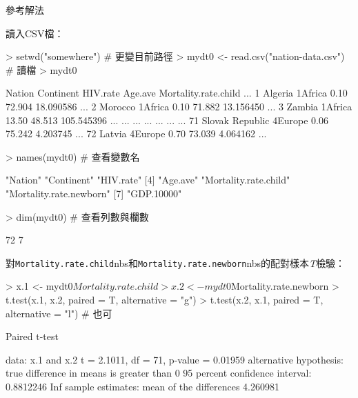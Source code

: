 \documentclass[14pt, aspectratio=43]{beamer}
\newcommand{\nbs}{\hskip3pt plus 1pt minus 1pt}
\begin{document}
\begin{frame}{參考解法}

讀入CSV檔：
\begin{RC}
> setwd("somewhere") # 更變目前路徑
> mydt0 <- read.csv("nation-data.csv")  # 讀檔
> mydt0
\end{RC}
\begin{R}
            Nation Continent HIV.rate Age.ave Mortality.rate.child ...
1          Algeria   1Africa     0.10  72.904            18.090586 ...
2          Morocco   1Africa     0.10  71.882            13.156450 ...
3           Zambia   1Africa    13.50  48.513           105.545396 ...
               ...       ...      ...     ...                  ... ...
71 Slovak Republic   4Europe     0.06  75.242             4.203745 ...
72          Latvia   4Europe     0.70  73.039             4.064162 ...
\end{R}

\framebreak 

\begin{RC}
> names(mydt0)  # 查看變數名
\end{RC}
\begin{R}
[1] "Nation"     "Continent"              "HIV.rate"              
[4] "Age.ave"    "Mortality.rate.child"   "Mortality.rate.newborn"
[7] "GDP.10000" 
\end{R}
\begin{RC}
> dim(mydt0)   # 查看列數與欄數
\end{RC}
\begin{R}
[1] 72  7
\end{R}

\framebreak 

對\nbs\verb+Mortality.rate.child+nbs{}和\nbs\verb+Mortality.rate.newborn+nbs{}的配對樣本\emph{T}檢驗：
\begin{RC}
> x.1 <- mydt0$Mortality.rate.child
> x.2 <- mydt0$Mortality.rate.newborn
> t.test(x.1, x.2, paired = T, alternative = "g")
> t.test(x.2, x.1, paired = T, alternative = "l") # 也可
\end{RC}

\begin{R}
	Paired t-test

data:  x.1 and x.2
t = 2.1011, df = 71, p-value = 0.01959
alternative hypothesis: true difference in means is greater than 0
95 percent confidence interval:
 0.8812246       Inf
sample estimates:
mean of the differences 
               4.260981
\end{R}


\end{frame}
\end{document}
